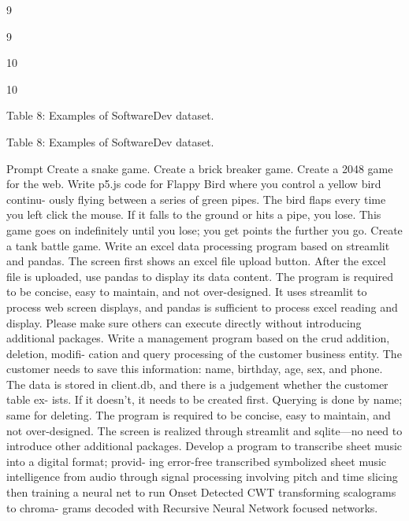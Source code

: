 \documentclass[12pt]{article}
\begin{document}
9


9


10


10


Table 8: Examples of SoftwareDev dataset.


Table 8: Examples of SoftwareDev dataset.


Prompt
Create a snake game.
Create a brick breaker game.
Create a 2048 game for the web.
Write p5.js code for Flappy Bird where you control a yellow bird continu-
ously flying between a series of green pipes. The bird flaps every time you
left click the mouse. If it falls to the ground or hits a pipe, you lose. This
game goes on indefinitely until you lose; you get points the further you go.
Create a tank battle game.
Write an excel data processing program based on streamlit and pandas. The
screen first shows an excel file upload button. After the excel file is uploaded,
use pandas to display its data content. The program is required to be concise,
easy to maintain, and not over-designed. It uses streamlit to process web
screen displays, and pandas is sufficient to process excel reading and display.
Please make sure others can execute directly without introducing additional
packages.
Write a management program based on the crud addition, deletion, modifi-
cation and query processing of the customer business entity. The customer
needs to save this information: name, birthday, age, sex, and phone. The data
is stored in client.db, and there is a judgement whether the customer table ex-
ists. If it doesn’t, it needs to be created first. Querying is done by name; same
for deleting. The program is required to be concise, easy to maintain, and not
over-designed. The screen is realized through streamlit and sqlite—no need
to introduce other additional packages.
Develop a program to transcribe sheet music into a digital format; provid-
ing error-free transcribed symbolized sheet music intelligence from audio
through signal processing involving pitch and time slicing then training a
neural net to run Onset Detected CWT transforming scalograms to chroma-
grams decoded with Recursive Neural Network focused networks.
\end{document}
